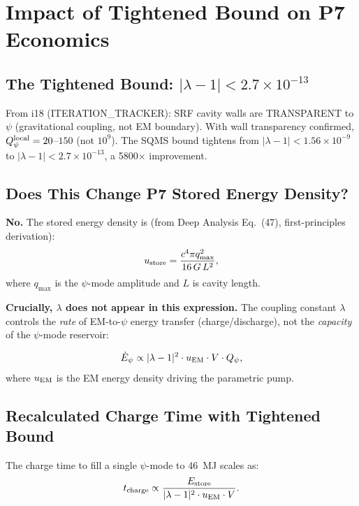 \documentclass[11pt]{article}
\newcommand{\ee}[1]{\times 10^{#1}}
\newcommand{\lambdaone}{|\lambda-1|}
\newcommand{\Qpsi}{Q_\psi}
\begin{document}
\section{Impact of Tightened Bound on P7 Economics}\label{sec:bound}

\subsection{The Tightened Bound: $\lambdaone < 2.7\ee{-13}$}

From i18 (ITERATION\_TRACKER): SRF cavity walls are TRANSPARENT to
$\psi$ (gravitational coupling, not EM boundary). With wall transparency
confirmed, $\Qpsi^{\rm local} = 20$--$150$ (not $10^9$). The SQMS
bound tightens from $\lambdaone < 1.56\ee{-9}$ to
$\lambdaone < 2.7\ee{-13}$, a 5800$\times$ improvement.

\subsection{Does This Change P7 Stored Energy Density?}

\textbf{No.} The stored energy density is (from Deep Analysis
Eq.~(47), first-principles derivation):
\begin{equation}\label{eq:u-store}
u_{\rm store} = \frac{c^4 \pi q_{\max}^2}{16\,G\,L^2},
\end{equation}
where $q_{\max}$ is the $\psi$-mode amplitude and $L$ is cavity length.

\textbf{Crucially, $\lambda$ does not appear in this expression.}
The coupling constant $\lambda$ controls the \emph{rate} of EM-to-$\psi$
energy transfer (charge/discharge), not the \emph{capacity} of the
$\psi$-mode reservoir:

\begin{equation}\label{eq:charge-rate}
\dot{E}_\psi \propto \lambdaone^2 \cdot u_{\rm EM} \cdot V \cdot \Qpsi,
\end{equation}
where $u_{\rm EM}$ is the EM energy density driving the parametric pump.

\subsection{Recalculated Charge Time with Tightened Bound}

The charge time to fill a single $\psi$-mode to 46~MJ scales as:
\begin{equation}
t_{\rm charge} \propto \frac{E_{\rm store}}{\lambdaone^2 \cdot u_{\rm EM} \cdot V}.
\end{equation}
\end{document}
